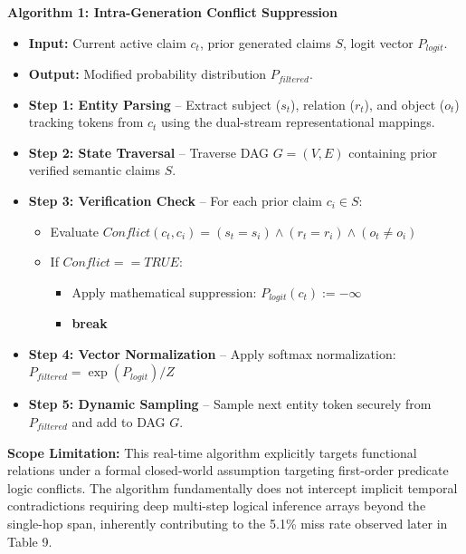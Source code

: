 \documentclass[10pt,journal,compsoc]{IEEEtran}
\begin{document}
\vspace{2mm}
\noindent\textbf{Algorithm 1: Intra-Generation Conflict Suppression}

\begin{itemize}

\item \textbf{Input:} Current active claim $c_t$, prior generated claims $S$, logit vector $P_{logit}$.

\item \textbf{Output:} Modified probability distribution $P_{filtered}$.

\item \textbf{Step 1: Entity Parsing} -- Extract subject ($s_t$), relation ($r_t$), and object ($o_t$) tracking tokens from $c_t$ using the dual-stream representational mappings.

\item \textbf{Step 2: State Traversal} -- Traverse DAG $G = (V, E)$ containing prior verified semantic claims $S$.

\item \textbf{Step 3: Verification Check} -- For each prior claim $c_i \in S$:

\begin{itemize}

\item Evaluate $Conflict(c_t, c_i) = (s_t = s_i) \land (r_t = r_i) \land (o_t \neq o_i)$

\item If $Conflict == TRUE$:

\begin{itemize}\item Apply mathematical suppression: $P_{logit}(c_t) := -\infty$\item \textbf{break}\end{itemize}

\end{itemize}

\item \textbf{Step 4: Vector Normalization} -- Apply softmax normalization: $P_{filtered} = \exp(P_{logit}) / Z$

\item \textbf{Step 5: Dynamic Sampling} -- Sample next entity token securely from $P_{filtered}$ and add to DAG $G$.

\end{itemize}

\textbf{Scope Limitation:} This real-time algorithm explicitly targets functional relations under a formal closed-world assumption targeting first-order predicate logic conflicts. The algorithm fundamentally does not intercept implicit temporal contradictions requiring deep multi-step logical inference arrays beyond the single-hop span, inherently contributing to the 5.1\% miss rate observed later in Table 9.
\end{document}
